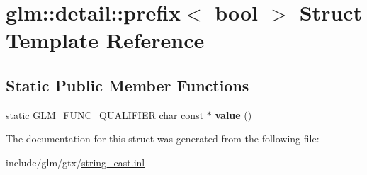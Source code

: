 \hypertarget{structglm_1_1detail_1_1prefix_3_01bool_01_4}{}\section{glm\+:\+:detail\+:\+:prefix$<$ bool $>$ Struct Template Reference}
\label{structglm_1_1detail_1_1prefix_3_01bool_01_4}
\subsection*{Static Public Member Functions}
\begin{DoxyCompactItemize}
\item 
\mbox{\label{structglm_1_1detail_1_1prefix_3_01bool_01_4_ab6d6392aa906c684f1abdda98830adad}} 
static G\+L\+M\+\_\+\+F\+U\+N\+C\+\_\+\+Q\+U\+A\+L\+I\+F\+I\+ER char const  $\ast$ {\bfseries value} ()
\end{DoxyCompactItemize}


The documentation for this struct was generated from the following file\+:\begin{DoxyCompactItemize}
\item 
include/glm/gtx/\hyperlink{string__cast_8inl}{string\+\_\+cast.\+inl}\end{DoxyCompactItemize}
